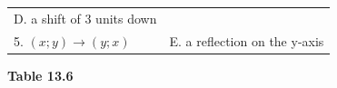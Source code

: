 {{\begin{center}
\begin{xtabular}[t]{|l|l|}
    
        D. a shift of 3 units down%
     \tabularnewline{}
    
    
        
5.
                    $\left(x;y\right)\to \left(y;x\right)$
                   &
    
    
        E. a reflection on the y-axis%
     \tabularnewline{}
    \end{xtabular}
      \end{center}
    \begin{center}{\small\bfseries Table 13.6}\end{center}
    
    \addtocounter{footnote}{-0}
    
          } %
        }{%
        }
